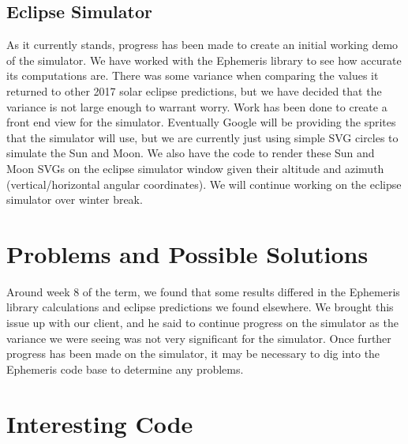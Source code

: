 \documentclass[10pt, onecolumn, draftclsnofoot, letterpaper, compsoc]{IEEEtran}
\begin{document}
\subsection{Eclipse Simulator}

As it currently stands, progress has been made to create an initial working
demo of the simulator. We have worked with the Ephemeris library to see how
accurate its computations are. There was some variance when comparing the
values it returned to other 2017 solar eclipse predictions, but we have
decided that the variance is not large enough to warrant worry. Work has
been done to create a front end view for the simulator. Eventually Google
will be providing the sprites that the simulator will use, but we are currently
just using simple SVG circles to simulate the Sun and Moon. We also have the
code to render these Sun and Moon SVGs on the eclipse simulator window given
their altitude and azimuth (vertical/horizontal angular coordinates). We will
continue working on the eclipse simulator over winter break.

\section{Problems and Possible Solutions}

Around week 8 of the term, we found that some results differed in the Ephemeris
library calculations and eclipse predictions we found elsewhere. We brought
this issue up with our client, and he said to continue progress on the
simulator as the variance we were seeing was not very significant for the
simulator. Once further progress has been made on the simulator, it may be
necessary to dig into the Ephemeris code base to determine any problems.

\section{Interesting Code}
\end{document}

